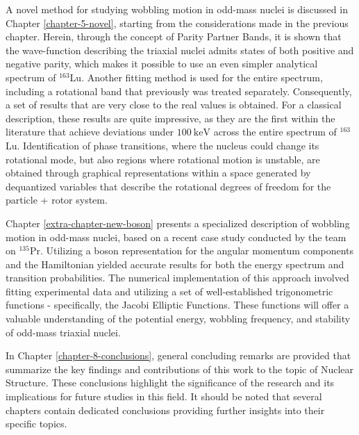 A novel method for studying wobbling motion in odd-mass nuclei is discussed in Chapter \ref{chapter-5-novel}, starting from the considerations made in the previous chapter. Herein, through the concept of Parity Partner Bands, it is shown that the wave-function describing the triaxial nuclei admits states of both positive and negative parity, which makes it possible to use an even simpler analytical spectrum of $^{163}$Lu. Another fitting method is used for the entire spectrum, including a rotational band that previously was treated separately. Consequently, a set of results that are very close to the real values is obtained. For a classical description, these results are quite impressive, as they are the first within the literature that achieve deviations under $100\ \text{keV}$ across the entire spectrum of $^{163}$Lu. Identification of phase transitions, where the nucleus could change its rotational mode, but also regions where rotational motion is unstable, are obtained through graphical representations within a space generated by dequantized variables that describe the rotational degrees of freedom for the particle + rotor system. 

Chapter \ref{extra-chapter-new-boson} presents a specialized description of wobbling motion in odd-mass nuclei, based on a recent case study conducted by the team on $^{135}$Pr. Utilizing a boson representation for the angular momentum components and the Hamiltonian yielded accurate results for both the energy spectrum and transition probabilities. The numerical implementation of this approach involved fitting experimental data and utilizing a set of well-established trigonometric functions - specifically, the Jacobi Elliptic Functions. These functions will offer a valuable understanding of the potential energy, wobbling frequency, and stability of odd-mass triaxial nuclei.

In Chapter \ref{chapter-8-conclusions}, general concluding remarks are provided that summarize the key findings and contributions of this work to the topic of Nuclear Structure. These conclusions highlight the significance of the research and its implications for future studies in this field. It should be noted that several chapters contain dedicated conclusions providing further insights into their specific topics.%